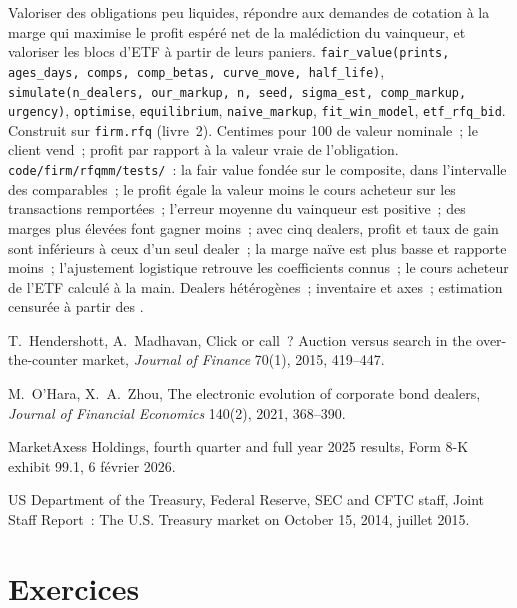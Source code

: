 \begin{build}
 Valoriser des obligations peu liquides, répondre aux demandes de cotation à la marge qui maximise le profit espéré net de la malédiction du vainqueur, et valoriser les
blocs d'ETF à partir de leurs paniers.
 \texttt{fair\_value(prints, ages\_days, comps, comp\_betas, curve\_move, half\_life)},
\texttt{simulate(n\_dealers, our\_markup, n, seed, sigma\_est, comp\_markup, urgency)}, \texttt{optimise}, \texttt{equilibrium}, \texttt{naive\_markup}, \texttt{fit\_win\_model},
\texttt{etf\_rfq\_bid}. Construit sur \texttt{firm.rfq} (livre~2).
 Centimes pour 100 de valeur nominale~; le client vend~; profit par rapport à la valeur vraie de l'obligation.
 \texttt{code/firm/rfqmm/tests/}~: la fair value fondée sur le composite, dans l'intervalle des comparables~; le profit égale la valeur moins le cours acheteur sur
les transactions remportées~; l'erreur moyenne du vainqueur est positive~; des marges plus élevées font gagner moins~; avec cinq dealers, profit et taux de gain sont inférieurs à ceux d'un seul dealer~; la marge naïve
est plus basse et rapporte moins~; l'ajustement logistique retrouve les coefficients connus~; le cours acheteur de l'ETF calculé à la main.
 Dealers hétérogènes~; inventaire et axes~; estimation censurée à partir des .
\end{build}

\begin{omsources}
\item T.~Hendershott, A.~Madhavan, Click or call~? Auction versus search in the over-the-counter market, \emph{Journal of Finance} 70(1), 2015,
419--447.
\item M.~O'Hara, X.~A.~Zhou, The electronic evolution of corporate bond dealers, \emph{Journal of Financial Economics} 140(2), 2021, 368--390.
\item MarketAxess Holdings, fourth quarter and full year 2025 results, Form 8-K exhibit 99.1, 6 février 2026.
\item US Department of the Treasury, Federal Reserve, SEC and CFTC staff, Joint Staff Report~: The U.S. Treasury market on October 15, 2014, juillet 2015.
\end{omsources}

\section{Exercices}

